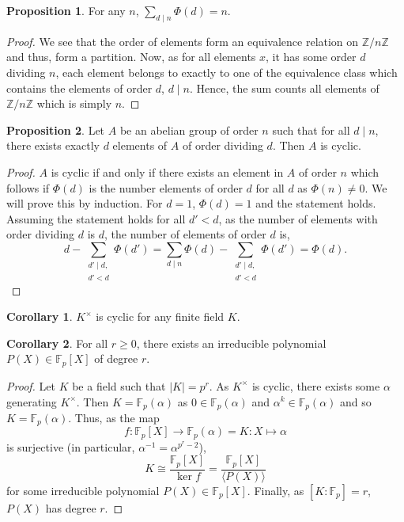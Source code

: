 \documentclass[]{article}
\theoremstyle{definition}
\newtheorem{corollary}{Corollary}[theorem]
\theoremstyle{definition}
\newtheorem{proposition}{Proposition}[section]
\begin{document}
\begin{proposition}
  For any \(n\), \(\sum_{d \mid n} \Phi(d) = n\).
\end{proposition}
\begin{proof}
  We see that the order of elements form an equivalence relation on 
  \(\mathbb{Z}/n\mathbb{Z}\) and thus, form a partition. Now, as for all 
  elements \(x\), it has some order \(d\) dividing \(n\), each element belongs 
  to exactly to one of the equivalence class which contains the elements of 
  order \(d\), \(d \mid n\). Hence, the sum counts all elements of 
  \(\mathbb{Z}/n\mathbb{Z}\) which is simply \(n\).
\end{proof}

\begin{proposition}
  Let \(A\) be an abelian group of order \(n\) such that for all \(d \mid n\), 
  there exists exactly \(d\) elements of \(A\) of order dividing \(d\). Then 
  \(A\) is cyclic.
\end{proposition}
\begin{proof}
  \(A\) is cyclic if and only if there exists an element in \(A\) of order 
  \(n\) which follows if \(\Phi(d)\) is the number elements of order 
  \(d\) for all \(d\) as \(\Phi(n) \neq 0\). We will prove this by induction. 
  For \(d = 1\), \(\Phi(d) = 1\) and the statement holds. Assuming the statement 
  holds for all \(d' < d\), as the number of elements with order dividing 
  \(d\) is \(d\), the number of elements of order \(d\) is,
  \[d - \sum_{\substack{d' \mid d, \\ d' < d}} \Phi(d') = 
  \sum_{d \mid n} \Phi(d) - \sum_{\substack{d' \mid d, \\ d' < d}} \Phi(d')
  = \Phi(d).\]
\end{proof}

\begin{corollary}
  \(K^\times\) is cyclic for any finite field \(K\).
\end{corollary}

\begin{corollary}
  For all \(r \ge 0\), there exists an irreducible polynomial 
  \(P(X) \in \mathbb{F}_p[X]\) of degree \(r\).
\end{corollary}
\begin{proof}
  Let \(K\) be a field such that \(|K| = p^r\). As \(K^\times\) is cyclic, 
  there exists some \(\alpha\) generating \(K^\times\). 
  Then \(K = \mathbb{F}_p(\alpha)\) 
  as \(0 \in \mathbb{F}_p(\alpha)\) and \(\alpha^k \in \mathbb{F}_p(\alpha)\) 
  and so \(K = \mathbb{F}_p(\alpha)\). Thus, as the map 
  \[f : \mathbb{F}_p[X] \to \mathbb{F}_p(\alpha) = K : X \mapsto \alpha\]
  is surjective (in particular, \(\alpha^{-1} = \alpha^{p^r - 2}\)), 
  \[K \cong \frac{\mathbb{F}_p[X]}{\ker f} = 
    \frac{\mathbb{F}_p[X]}{\langle P(X) \rangle}\]
  for some irreducible polynomial \(P(X) \in \mathbb{F}_p[X]\). Finally, 
  as \([K : \mathbb{F}_p] = r\), \(P(X)\) has degree \(r\).
\end{proof}
\end{document}
